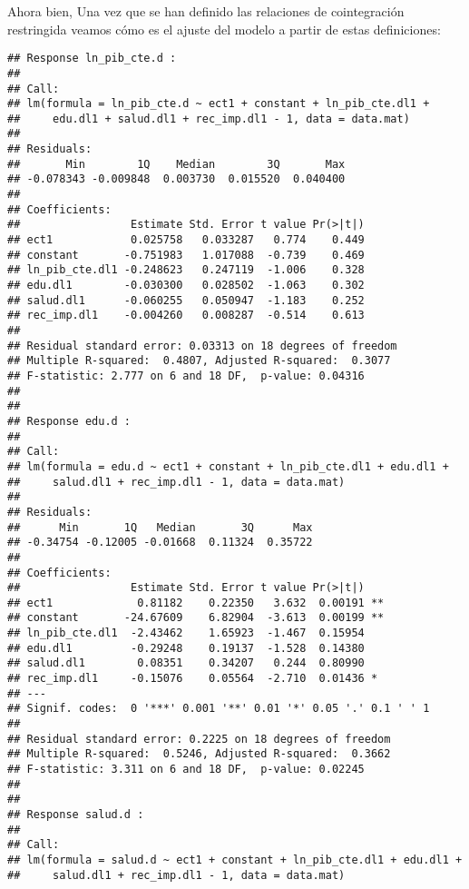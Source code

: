 \documentclass[]{book}
\newenvironment{Shaded}{\begin{snugshade}}{\end{snugshade}}
\newcommand{\KeywordTok}[1]{\textcolor[rgb]{0.13,0.29,0.53}{\textbf{#1}}}
\newcommand{\OperatorTok}[1]{\textcolor[rgb]{0.81,0.36,0.00}{\textbf{#1}}}
\newcommand{\NormalTok}[1]{#1}
\theoremstyle{definition}
\theoremstyle{definition}
\theoremstyle{definition}
\theoremstyle{remark}
\begin{document}
Ahora bien, Una vez que se han definido las relaciones de cointegración
restringida veamos cómo es el ajuste del modelo a partir de estas
definiciones:

\begin{Shaded}
\end{Shaded}

\begin{verbatim}
## Response ln_pib_cte.d :
## 
## Call:
## lm(formula = ln_pib_cte.d ~ ect1 + constant + ln_pib_cte.dl1 + 
##     edu.dl1 + salud.dl1 + rec_imp.dl1 - 1, data = data.mat)
## 
## Residuals:
##       Min        1Q    Median        3Q       Max 
## -0.078343 -0.009848  0.003730  0.015520  0.040400 
## 
## Coefficients:
##                 Estimate Std. Error t value Pr(>|t|)
## ect1            0.025758   0.033287   0.774    0.449
## constant       -0.751983   1.017088  -0.739    0.469
## ln_pib_cte.dl1 -0.248623   0.247119  -1.006    0.328
## edu.dl1        -0.030300   0.028502  -1.063    0.302
## salud.dl1      -0.060255   0.050947  -1.183    0.252
## rec_imp.dl1    -0.004260   0.008287  -0.514    0.613
## 
## Residual standard error: 0.03313 on 18 degrees of freedom
## Multiple R-squared:  0.4807, Adjusted R-squared:  0.3077 
## F-statistic: 2.777 on 6 and 18 DF,  p-value: 0.04316
## 
## 
## Response edu.d :
## 
## Call:
## lm(formula = edu.d ~ ect1 + constant + ln_pib_cte.dl1 + edu.dl1 + 
##     salud.dl1 + rec_imp.dl1 - 1, data = data.mat)
## 
## Residuals:
##      Min       1Q   Median       3Q      Max 
## -0.34754 -0.12005 -0.01668  0.11324  0.35722 
## 
## Coefficients:
##                 Estimate Std. Error t value Pr(>|t|)   
## ect1             0.81182    0.22350   3.632  0.00191 **
## constant       -24.67609    6.82904  -3.613  0.00199 **
## ln_pib_cte.dl1  -2.43462    1.65923  -1.467  0.15954   
## edu.dl1         -0.29248    0.19137  -1.528  0.14380   
## salud.dl1        0.08351    0.34207   0.244  0.80990   
## rec_imp.dl1     -0.15076    0.05564  -2.710  0.01436 * 
## ---
## Signif. codes:  0 '***' 0.001 '**' 0.01 '*' 0.05 '.' 0.1 ' ' 1
## 
## Residual standard error: 0.2225 on 18 degrees of freedom
## Multiple R-squared:  0.5246, Adjusted R-squared:  0.3662 
## F-statistic: 3.311 on 6 and 18 DF,  p-value: 0.02245
## 
## 
## Response salud.d :
## 
## Call:
## lm(formula = salud.d ~ ect1 + constant + ln_pib_cte.dl1 + edu.dl1 + 
##     salud.dl1 + rec_imp.dl1 - 1, data = data.mat)

\end{verbatim}
\end{document}
